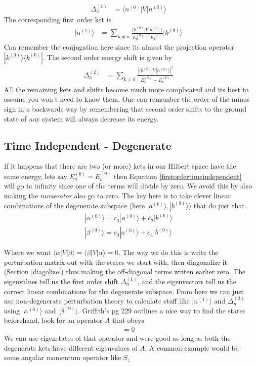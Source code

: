 \begin{align}
\Delta_n^{(1)} &= \langle n^{(0)}|V|n^{(0)}\rangle
\end{align}
The corresponding first order ket is
\begin{align}\label{firstordertimeindependent}
 |n^{(1)}\rangle &= \sum_{k\neq n}\frac{\langle k^{(0)} |V|n^{(0)}\rangle}{E_n^{(0)}-E_k^{(0)}}|k^{(0)}\rangle
\end{align}
Can remember the conjugation here since its almost the projection operator $|k^{(0)}\rangle\langle k^{(0)}|$. The second order energy shift is given by
\begin{align}
\Delta_n^{(2)} &= \sum_{k\neq n} \frac{|\langle k^{(0)}| V| n^{(0)}\rangle|^2}{E_n^{(0)} - E_k^{(0)}}
\end{align}
All the remaining kets and shifts become much more complicated and its best to assume you won't need to know them. One can remember the order of the minus sign in a backwards way by remembering that second order shifts to the ground state of \emph{an}y system will always decrease its energy. 


\subsection{Time Independent - Degenerate}
If it happens that there are two (or more) kets in our Hilbert space have the same energy, lets say $E_a^{(0)} = E_b^{(0)}$ then Equation \ref{firstordertimeindependent} will go to infinity since one of the terms will divide by zero. We avoid this by also making the \emph{numerator} also go to zero. The key here is to take clever linear combinations of the degenerate subspace (here $|a^{(0)}\rangle, |b^{(0)}\rangle$) that do just that. 
\begin{align}
|\alpha^{(0)}\rangle = c_1 |a^{(0)}\rangle + c_2|b^{(0)}\rangle\\
|\beta^{(0)}\rangle = c_3|a^{(0)}\rangle + c_4|b^{(0)}\rangle
\end{align}

Where we want $\langle \alpha |V |\beta \rangle = \langle \beta |V|\alpha\rangle  = 0$. The way we do this is write the perturbation matrix out with the states we start with, then diagonalize it (Section \ref{diagolize}) thus making the off-diagonal terms writen earlier zero. The eigenvalues tell us the first order shift $\Delta_n^{(1)}$, and the eigenvectors tell us the correct linear combinations for the degenerate subspace. From here we can just use non-degenerate perturbation theory to calculate stuff like $|n^{(1)}\rangle$ and $\Delta_n^{(2)}$ using $|\alpha^{(0)}\rangle$ and $|\beta^{(0)}\rangle$. 
Griffith's pg 229 outlines a nice way to find the states beforehand, look for an operator $A$ that obeys 
\begin{align}
[A,V] = 0
\end{align}
We can use eigenstates of that operator and were good as long as both the degenerate kets have different eigenvalues of $A$. A common example would be some angular momentum operator like $S_z$

